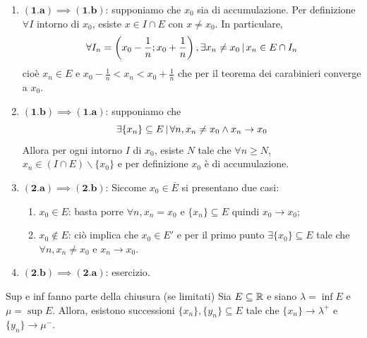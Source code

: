 \documentclass[a4paper]{article}
\begin{document}
\begin{snippetproof}{}
    \begin{enumerate}
        \item \(\mathbf{(1.a) \implies (1.b)}\): supponiamo che \(x_0\)
        sia di accumulazione. Per definizione \(\forall I\) intorno di \(x_0\),
        esiste \(x\in I \cap E\) con \(x\neq x_0\). In particulare,
        \[\forall I_n = \left(x_0 - \frac{1}{n}; x_0 + \frac{1}{n}\right), \exists x_n \neq x_0 \,|\, x_n \in E \cap I_n\]
        cioè \(x_n \in E\) e \(x_0 - \frac{1}{n} < x_n < x_0 + \frac{1}{n}\)
        che per il teorema dei carabinieri converge a \(x_0\).
        \item \(\mathbf{(1.b) \implies (1.a)}\): supponiamo che
        \[
            \exists \{x_n\} \subseteq E \,|\, \forall n, x_n \neq x_0 \land x_n \to x_0
        \]
        Allora per ogni intorno \(I\) di \(x_0\), esiste \(N\) tale che
        \(\forall n \geq N\), \(x_n \in (I \cap E) \backslash \{x_0\}\)
        e per definizione \(x_0\) è di accumulazione.
        \item \(\mathbf{(2.a) \implies (2.b)}\):
        Siccome \(x_0 \in \overline{E}\) si presentano due casi:
        \begin{enumerate}
            \item \(x_0 \in E\): basta porre \(\forall n, x_n = x_0\) e \(\{x_n\} \subseteq E\)
            quindi \(x_0 \to x_0\);
            \item \(x_0 \notin E\): ciò implica che \(x_0 \in E'\) e per il primo punto
            \(\exists \{x_0\} \subseteq E\) tale che \(\forall n, x_n \neq x_0\)
            e \(x_n \to x_0\).
        \end{enumerate}
        \item \(\mathbf{(2.b) \implies (2.a)}\): esercizio.
    \end{enumerate}
\end{snippetproof}

\begin{snippettheorem}{Sup e inf fanno parte della chiusura (se limitati)}
    Sia \(E \subseteq \mathbb{R}\) e siano \(\lambda = \inf E\)
    e \(\mu = \sup E\). Allora, esistono successioni \(\{x_n\}, \{y_n\} \subseteq E\)
    tale che \(\{x_n\} \to \lambda^+\) e \(\{y_n\} \to \mu^-\).
\end{snippettheorem}
\end{document}
